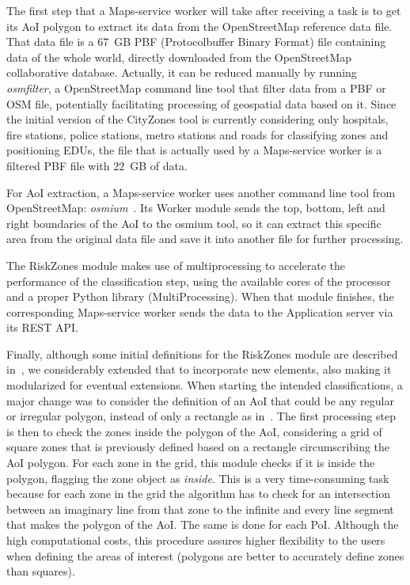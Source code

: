 \begin{refsection}
The first step that a Maps-service worker will take after receiving a task is to get its AoI polygon to extract its data from the OpenStreetMap reference data file. That data file is a 67~GB PBF (Protocolbuffer Binary Format) file containing data of the whole world, directly downloaded from the OpenStreetMap collaborative database. Actually, it can be reduced manually by running \emph{osmfilter}, a OpenStreetMap command line tool that filter data from a PBF or OSM file, potentially facilitating processing of geospatial data based on it. Since the initial version of the CityZones tool is currently considering only hospitals, fire stations, police stations, metro stations and roads for classifying zones and positioning EDUs, the file that is actually used by a Maps-service worker is a filtered PBF file with 22~GB of data.

For AoI extraction, a Maps-service worker uses another command line tool from OpenStreetMap: \emph{osmium}~\cite{osmium}. Its Worker module sends the top, bottom, left and right boundaries of the AoI to the osmium tool, so it can extract this specific area from the original data file and save it into another file for further processing. 
 
The RiskZones module makes use of multiprocessing to accelerate the performance of the classification step, using the available cores of the processor and a proper Python library (MultiProcessing). When that module finishes, the corresponding Maps-service worker sends the data to the Application server via its REST API.

Finally, although some initial definitions for the RiskZones module are described in~\cite{riskzones}, we considerably extended that to incorporate new elements, also making it modularized for eventual extensions. When starting the intended classifications, a major change was to consider the definition of an AoI that could be any regular or irregular polygon, instead of only a rectangle as in~\cite{riskzones}. The first processing step is then to check the zones inside the polygon of the AoI, considering a grid of square zones that is previously defined based on a rectangle circumscribing the AoI polygon. For each zone in the grid, this module checks if it is inside the polygon, flagging the zone object as \emph{inside}. This is a very time-consuming task because for each zone in the grid the algorithm has to check for an intersection between an imaginary line from that zone to the infinite and every line segment that makes the polygon of the AoI. The same is done for each PoI. Although the high computational costs, this procedure assures higher flexibility to the users when defining the areas of interest (polygons are better to accurately define zones than squares). 


\end{refsection}

